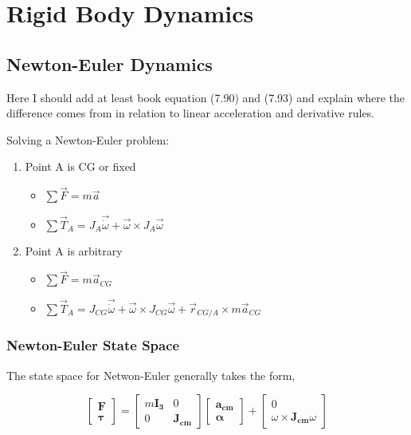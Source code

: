 \section{Rigid Body Dynamics}

\subsection{Newton-Euler Dynamics}
Here I should add at least book equation (7.90) and (7.93) and explain where the difference comes from in relation to linear acceleration and derivative rules. 


Solving a Newton-Euler problem:
\begin{enumerate}
    \item Point A is CG or fixed
    \begin{itemize}
        \item $\sum \vec{F}=m\vec{a}$
        \item $\sum\vec{T}_{A}=J_A\vec{\dot{\omega}}+\vec{\omega}\times J_A\vec{\omega}$
    \end{itemize}
	  
    \item Point A is arbitrary
    \begin{itemize}
        \item $\sum \vec{F}=m\vec{a}_{CG}$
        \item $\sum\vec{T}_A=J_{CG}\vec{\dot{\omega}}+\vec{\omega}\times J_{CG}\vec{\omega}+\vec{r}_{CG/A}\times m\vec{a}_{CG}$
    \end{itemize}
\end{enumerate}

\subsubsection{Newton-Euler State Space}

The state space for Netwon-Euler generally takes the form,

\begin{equation}
    \begin{bmatrix}
        \mathbf{F} \\ \mathbf{\tau}
    \end{bmatrix} = \begin{bmatrix}
        m\mathbf{I_3} & 0
        \\
        0 & \mathbf{J_{cm}}
    \end{bmatrix} \begin{bmatrix}
        \mathbf{a_{cm}} \\ \mathbf{\alpha}
    \end{bmatrix} + \begin{bmatrix}
        0 \\ \omega\times\mathbf{J_{cm}}\omega
    \end{bmatrix}
\end{equation}


